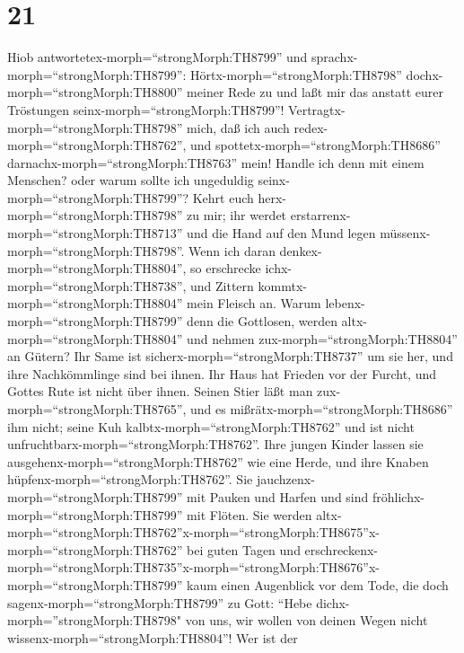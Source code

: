 \hypertarget{section-20}{%
\section{21}\label{section-20}}

 Hiob antwortetex-morph=``strongMorph:TH8799'' und
sprachx-morph=``strongMorph:TH8799'': 
Hörtx-morph=``strongMorph:TH8798'' dochx-morph=``strongMorph:TH8800''
meiner Rede zu und laßt mir das anstatt eurer Tröstungen
seinx-morph=``strongMorph:TH8799''! 
Vertragtx-morph=``strongMorph:TH8798'' mich, daß ich auch
redex-morph=``strongMorph:TH8762'', und
spottetx-morph=``strongMorph:TH8686''
darnachx-morph=``strongMorph:TH8763'' mein!  Handle ich denn
mit einem Menschen? oder warum sollte ich ungeduldig
seinx-morph=``strongMorph:TH8799''?  Kehrt euch
herx-morph=``strongMorph:TH8798'' zu mir; ihr werdet
erstarrenx-morph=``strongMorph:TH8713'' und die Hand auf den Mund legen
müssenx-morph=``strongMorph:TH8798''.  Wenn ich daran
denkex-morph=``strongMorph:TH8804'', so erschrecke
ichx-morph=``strongMorph:TH8738'', und Zittern
kommtx-morph=``strongMorph:TH8804'' mein Fleisch an.  Warum
lebenx-morph=``strongMorph:TH8799'' denn die Gottlosen, werden
altx-morph=``strongMorph:TH8804'' und nehmen
zux-morph=``strongMorph:TH8804'' an Gütern?  Ihr Same ist
sicherx-morph=``strongMorph:TH8737'' um sie her, und ihre Nachkömmlinge
sind bei ihnen.  Ihr Haus hat Frieden vor der Furcht, und
Gottes Rute ist nicht über ihnen.  Seinen Stier läßt man
zux-morph=``strongMorph:TH8765'', und es
mißrätx-morph=``strongMorph:TH8686'' ihm nicht; seine Kuh
kalbtx-morph=``strongMorph:TH8762'' und ist nicht
unfruchtbarx-morph=``strongMorph:TH8762''.  Ihre jungen
Kinder lassen sie ausgehenx-morph=``strongMorph:TH8762'' wie eine Herde,
und ihre Knaben hüpfenx-morph=``strongMorph:TH8762''.  Sie
jauchzenx-morph=``strongMorph:TH8799'' mit Pauken und Harfen und sind
fröhlichx-morph=``strongMorph:TH8799'' mit Flöten.  Sie
werden
altx-morph=``strongMorph:TH8762''\textbar x-morph=``strongMorph:TH8675''x-morph=``strongMorph:TH8762''
bei guten Tagen und
erschreckenx-morph=``strongMorph:TH8735''\textbar x-morph=``strongMorph:TH8676''x-morph=``strongMorph:TH8799''
kaum einen Augenblick vor dem Tode,  die doch
sagenx-morph=``strongMorph:TH8799'' zu Gott: ``Hebe
dichx-morph=''strongMorph:TH8798" von uns, wir wollen von deinen Wegen
nicht wissenx-morph=``strongMorph:TH8804''!  Wer ist der
